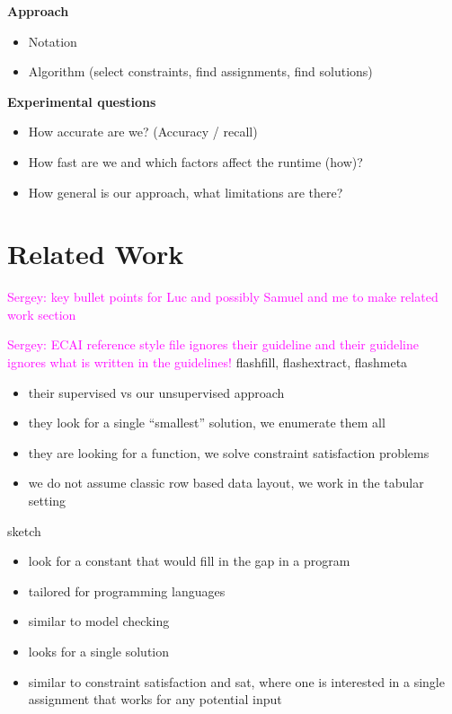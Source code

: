 \documentclass{ecai}
\newcommand{\sergey}[1]{\textcolor{magenta}{{\sc Sergey:} #1}\xspace}
\begin{document}
\textbf{Approach}
\begin{itemize}
  \item Notation
  \item Algorithm (select constraints, find assignments, find solutions)
\end{itemize}

{\bfseries 
  Experimental questions
}
\begin{itemize}
  \item  How accurate are we? (Accuracy / recall)
  \item  How fast are we and which factors affect the runtime (how)?
  \item  How general is our approach, what limitations are there?
\end{itemize}


\section{Related Work}
\sergey{key bullet points for Luc and possibly Samuel and me to make related work section}

\sergey{ECAI reference style file ignores their guideline and their guideline ignores what is written in the guidelines!}
flashfill, flashextract, flashmeta \cite{flashfill,flashextract,flashmeta}
\begin{itemize}
  \item their supervised vs our unsupervised approach
  \item they look for a single ``smallest'' solution, we enumerate them all
  \item they are looking for a function, we solve constraint satisfaction problems
  \item we do not assume classic row based data layout, we work in the tabular setting
\end{itemize}

sketch \cite{sketch}
\begin{itemize}
  \item look for a constant that would fill in the gap in a program
  \item tailored for programming languages
  \item similar to model checking
  \item looks for a single solution
  \item similar to constraint satisfaction and sat, where one is interested in a single assignment that works for any potential input
\end{itemize}
\end{document}
